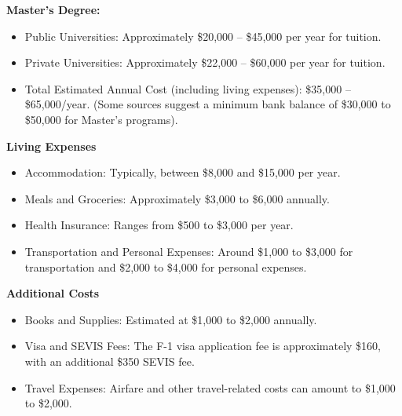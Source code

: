 \textbf{Master's Degree:}
\begin{itemize}
    \item Public Universities: Approximately \$20,000 -- \$45,000 per year for tuition.
    \item Private Universities: Approximately \$22,000 -- \$60,000 per year for tuition.
    \item Total Estimated Annual Cost (including living expenses): \$35,000 -- \$65,000/year. (Some sources suggest a minimum bank balance of \$30,000 to \$50,000 for Master's programs).
\end{itemize}

\textbf{Living Expenses}
\begin{itemize}
    \item Accommodation: Typically, between \$8,000 and \$15,000 per year.
    \item Meals and Groceries: Approximately \$3,000 to \$6,000 annually.
    \item Health Insurance: Ranges from \$500 to \$3,000 per year.
    \item Transportation and Personal Expenses: Around \$1,000 to \$3,000 for transportation and \$2,000 to \$4,000 for personal expenses.
\end{itemize}

\textbf{Additional Costs}
\begin{itemize}
    \item Books and Supplies: Estimated at \$1,000 to \$2,000 annually.
    \item Visa and SEVIS Fees: The F-1 visa application fee is approximately \$160, with an additional \$350 SEVIS fee.
    \item Travel Expenses: Airfare and other travel-related costs can amount to \$1,000 to \$2,000.
\end{itemize}



